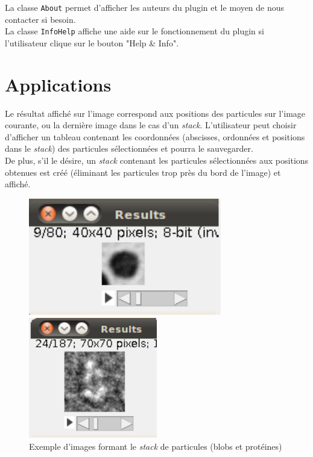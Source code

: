 La classe \texttt{About} permet d'afficher les auteurs du plugin et le moyen de nous contacter si besoin. \\

La classe \texttt{InfoHelp} affiche une aide sur le fonctionnement du plugin si l'utilisateur  clique sur le bouton "Help \& Info". 

\section{Applications}

Le résultat affiché sur l'image correspond aux positions des particules sur l'image courante, ou la dernière image dans le cas d'un \textit{stack}.
L'utilisateur peut choisir d'afficher un tableau contenant les coordonnées (abscisses, ordonnées et positions dans le \textit{stack}) des particules sélectionnées et pourra le sauvegarder. \\

De plus, s'il le désire, un \textit{stack} contenant les particules sélectionnées aux positions obtenues est créé (éliminant les particules trop près du bord de l'image) et affiché.

\begin{figure}[!ht]
\begin{center}
 \begin{minipage}{.450\linewidth}
  \includegraphics[width=0.75\textwidth]{cropblob.png}  
 \end{minipage} \hfill
\begin{minipage}{.450\linewidth}
  \includegraphics[width=0.5\textwidth]{cropprotDog.png}   
 \end{minipage} \hfill
\caption{Exemple d'images formant le \textit{stack} de particules (blobs et protéines)}
\end{center}
\end{figure}
